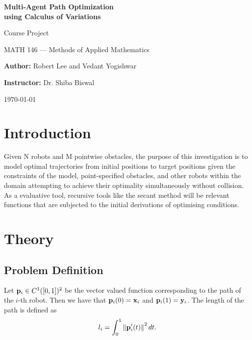 \documentclass[11pt]{article}
\begin{document}
\begin{titlepage}
    \centering
    \null
    
    {\huge \textbf{Multi-Agent Path Optimization\\using Calculus of Variations}\par}
    \vspace{5mm}
    {\Large \large Course Project\par
    MATH 146 --- Methods of Applied Mathematics\par}
    \vspace{5mm}
    {\large \textbf{Author:} Robert Lee and Vedant Yogishwar\par
    \textbf{Instructor:} Dr. Shiba Biswal\par}
    
    
    {\large \today\par}
\end{titlepage}

\clearpage

\tableofcontents

\clearpage

\printunsrtglossary[type=symbols,style=long,title={List of Symbols}]

\section{Introduction}
Given N robots and M pointwise obstacles, the purpose of this investigation is to model optimal trajectories from initial positions to target positions given the constraints of the model, point-specified obstacles, and other robots within the domain attempting to achieve their optimality simultaneously without collision. As a evaluative tool, recursive tools like the secant method will be relevant functions that are subjected to the initial derivations of optimising conditions. 

\section{Theory}

\subsection{Problem Definition}

Let \(\mathbf{p}_i \in C^1([0,1])^2\) be the vector valued function corresponding to the path of the \(i\)-th robot. Then we have that \(\mathbf{p}_i(0) = \mathbf{x}_i\) and \(\mathbf{p}_i(1) = \mathbf{y}_i\). The length of the path is defined as
\begin{equation}
    l_i = \int_0^1 \left\lVert \mathbf{p}_i'(t) \right\rVert^2 dt.
\end{equation}
\end{document}
